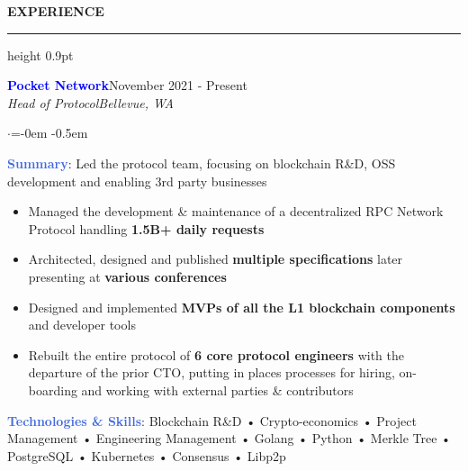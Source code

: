 \documentclass[
    11pt, %
]{resume} %
\newenvironment{rSectionCustom}[1]{
  \Large
  \sectionskip
  \textbf{\textcolor{Cerulean}{\MakeUppercase{#1}}}
  \vspace{0.5em}
  {\color{Blue}\hrule height 0.9pt}
  \vspace{0.25em}

  \begin{list}{}{
    \setlength{\leftmargin}{1.5em}
  }
  \item[]
}{
    \vspace{1em}
    \end{list}
}
\newenvironment{rSubsection2}[4]{
  \normalsize
  \hspace{-18pt}\textcolor{Blue}{\textbf{\large #1}}\hfill{#2}
  \\
  \hspace*{-18pt}\emph{#3}\hfill\emph{#4}
  \begin{list}{$\cdot$}{\leftmargin=-0em}
  \itemsep -0.5em \vspace{-0.25em}
}{
    \vspace{1em}
    \end{list}
}
\begin{document}
\begin{rSectionCustom}{Experience}

    \begin{rSubsection2}{Pocket Network}{November 2021 - Present}{Head of Protocol}{Bellevue, WA}

        \item[] \textcolor{RoyalBlue}{\textbf{Summary}}: Led the protocol team, focusing on blockchain R\&D, OSS development and enabling 3rd party businesses
        \begin{itemize}[leftmargin=*]
            \item Managed the development \& maintenance of a decentralized RPC Network Protocol handling \textbf{1.5B+ daily requests}
            \item Architected, designed and published \textbf{multiple specifications} later presenting at \textbf{various conferences}
            \item Designed and implemented \textbf{MVPs of all the L1 blockchain components} and developer tools
            \item Rebuilt the entire protocol of \textbf{6 core protocol engineers} with the departure of the prior CTO, putting in places processes for hiring, on-boarding and working with external parties \& contributors
        \end{itemize}
        \vspace{0.5em}
        \item[] \textcolor{RoyalBlue}{\textbf{Technologies \& Skills}}: Blockchain R\&D • Crypto-economics • Project Management • Engineering Management • Golang • Python • Merkle Tree • PostgreSQL • Kubernetes • Consensus • Libp2p
    \end{rSubsection2}


\end{rSectionCustom}
\end{document}
